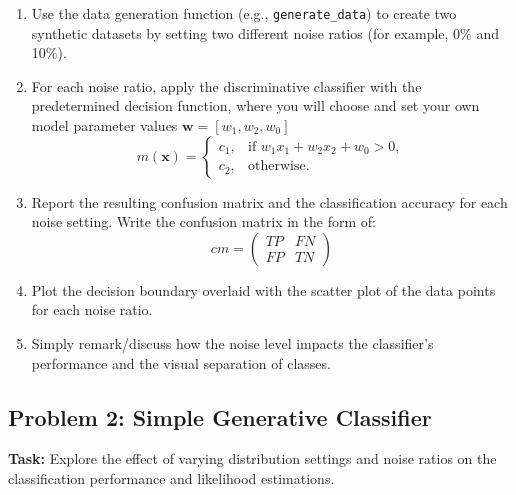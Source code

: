 \documentclass[12pt]{article}
\begin{document}
\begin{enumerate}[label=\alph*.]
    \item Use the data generation function (e.g., \texttt{generate\_data}) to create two synthetic datasets by setting two different noise ratios (for example, 0\% and 10\%).
    \item For each noise ratio, apply the discriminative classifier with the predetermined decision function, where you will choose and set your own model parameter values $\bm{w} = [w_1, w_2, w_0]$
    \[
    m(\mathbf{x}) =
    \begin{cases}
    c_1, & \text{if } w_1x_1 + w_2x_2 + w_0 > 0, \\
    c_2, & \text{otherwise.}
    \end{cases}
    \]
    \item Report the resulting confusion matrix and the classification accuracy for each noise setting. Write the confusion matrix in the form of:
        \[
 cm = \begin{pmatrix}

TP & FN \\

FP & TN
\end{pmatrix}
    \]
    \item Plot the decision boundary overlaid with the scatter plot of the data points for each noise ratio.
    \item Simply remark/discuss how the noise level impacts the classifier’s performance and the visual separation of classes.
\end{enumerate}

\newpage
\subsection*{Problem 2: Simple Generative Classifier}
\textbf{Task:} Explore the effect of varying distribution settings and noise ratios on the classification performance and likelihood estimations.
\end{document}
